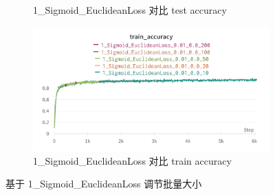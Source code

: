 \documentclass{article}
\begin{document}
\begin{figure}[htbp]
\begin{subfigure}{0.475\textwidth}
		\caption{1\_Sigmoid\_EuclideanLoss 对比 test accuracy}
	\end{subfigure}
	\begin{subfigure}{0.475\textwidth}
		\centering
		\includegraphics[width=1\textwidth]{../pics/批量_1_Sigmoid_EuclideanLoss_train_acc.png}
		\caption{1\_Sigmoid\_EuclideanLoss  对比 train accuracy}
	\end{subfigure}
	\caption{基于 1\_Sigmoid\_EuclideanLoss  调节批量大小}
	\label{fig:11}
\end{figure}
\end{document}
